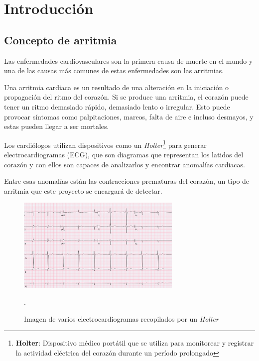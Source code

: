 \titlespacing*{\chapter}{0pt}{-1.25cm}{25pt}
\chapter{Introducción}
\section{Concepto de arritmia}
Las enfermedades cardiovasculares son la primera causa de muerte en el mundo \cite{roth2020global} y una de las causas más comunes de estas enfermedades son las arritmias.

Una arritmia cardiaca es un resultado de una alteración en la iniciación o propagación del ritmo del corazón.\cite{velez} Si se produce una arritmia, el corazón puede tener un ritmo demasiado rápido, demasiado lento o irregular. Esto puede provocar síntomas como palpitaciones, mareos, falta de aire e incluso desmayos, y estas pueden llegar a ser mortales.

Los cardiólogos utilizan dispositivos como un \textit{Holter}\footnote{\textbf{Holter}: Dispositivo médico portátil que se utiliza para monitorear y registrar la actividad eléctrica del corazón durante un período prolongado} para generar electrocardiogramas (ECG), que son diagramas que representan los latidos del corazón y con ellos son capaces de analizarlos y encontrar anomalías cardiacas.

Entre esas anomalías están las contracciones prematuras del corazón, un tipo de arritmia que este proyecto se encargará de detectar. 

\begin{figure}[h!]
	\centering
	\includegraphics[width=0.7\textwidth]{./Images/img_introduccion/electrocardiograma.png}
	\caption{Imagen de varios electrocardiogramas recopilados por un \textit{Holter} \cite{fotoElectrocardiograma}}.
	\label{fig:electrocardiogramas}
\end{figure}

